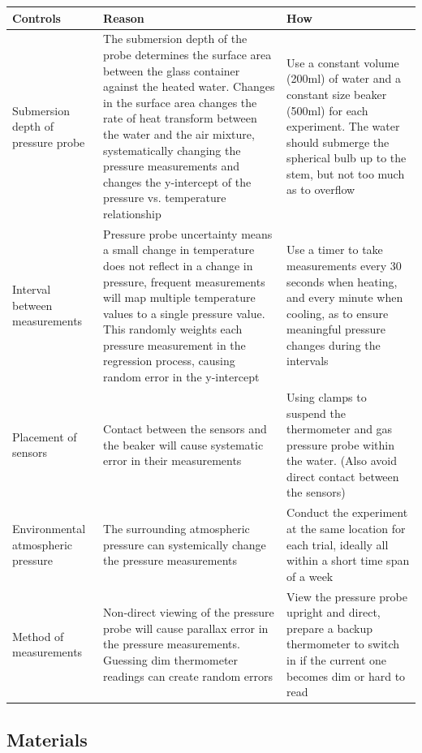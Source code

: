 \documentclass[a4paper,12pt]{article}
\begin{document}
\begin{longtable}{P{0.2\textwidth}|P{0.35\textwidth}|P{0.35\textwidth}}
Controls & Reason & How\\\hline

Submersion depth of pressure probe & The submersion depth of the probe determines the surface area between the glass container against the heated water. Changes in the surface area changes the rate of heat transform between the water and the air mixture, systematically changing the pressure measurements and changes the y-intercept of the pressure vs. temperature relationship & Use a constant volume (200ml) of water and a constant size beaker (500ml) for each experiment. The water should submerge the spherical bulb up to the stem, but not too much as to overflow \\

Interval between measurements & Pressure probe uncertainty means a small change in temperature does not reflect in a change in pressure, frequent measurements will map multiple temperature values to a single pressure value. This randomly weights each pressure measurement in the regression process, causing random error in the y-intercept & Use a timer to take measurements every 30 seconds when heating, and every minute when cooling, as to ensure meaningful pressure changes during the intervals \\

Placement of sensors & Contact between the sensors and the beaker will cause systematic error in their measurements & Using clamps to suspend the thermometer and gas pressure probe within the water. (Also avoid direct contact between the sensors) \\

Environmental atmospheric pressure & The surrounding atmospheric pressure can systemically change the pressure measurements & Conduct the experiment at the same location for each trial, ideally all within a short time span of a week
\\

Method of measurements & Non-direct viewing of the pressure probe will cause parallax error in the pressure measurements. Guessing dim thermometer readings can create random errors & View the pressure probe upright and direct, prepare a backup thermometer to switch in if the current one becomes dim or hard to read \\
\end{longtable}

\subsection{Materials}
\end{document}
